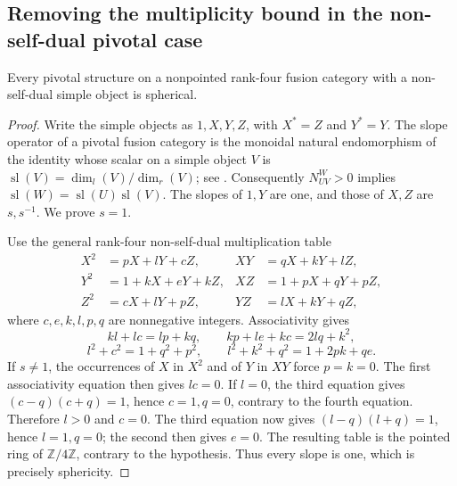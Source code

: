 \subsection{Removing the multiplicity bound in the non-self-dual pivotal case}

\begin{lemma}\label{lem:rank4-nonselfdual-spherical}
Every pivotal structure on a nonpointed rank-four fusion category with a
non-self-dual simple object is spherical.
\end{lemma}
\begin{proof}
Write the simple objects as $1,X,Y,Z$, with $X^*=Z$ and $Y^*=Y$.
The slope operator of a pivotal fusion category is the monoidal natural
endomorphism of the identity whose scalar on a simple object $V$ is
$\operatorname{sl}(V)=\dim_l(V)/\dim_r(V)$; see
\cite[Section~4C]{BVCenter}.
Consequently $N_{UV}^W>0$ implies
$\operatorname{sl}(W)=\operatorname{sl}(U)\operatorname{sl}(V)$.
The slopes of $1,Y$ are one, and those of $X,Z$ are $s,s^{-1}$.
We prove $s=1$.

Use the general rank-four non-self-dual multiplication table
\[
\begin{aligned}
 X^2&=pX+lY+cZ,& X Y&=qX+kY+lZ,\\
 Y^2&=1+kX+eY+kZ,& XZ&=1+pX+qY+pZ,\\
 Z^2&=cX+lY+pZ,& YZ&=lX+kY+qZ,
\end{aligned}
\]
where $c,e,k,l,p,q$ are nonnegative integers. Associativity gives
\[
 kl+lc=lp+kq,\qquad kp+le+kc=2lq+k^2,
\]
\[
 l^2+c^2=1+q^2+p^2,\qquad l^2+k^2+q^2=1+2pk+qe.
\]
If $s\ne1$, the occurrences of $X$ in $X^2$ and of $Y$ in $XY$ force
$p=k=0$. The first associativity equation then gives $lc=0$. If $l=0$,
the third equation gives $(c-q)(c+q)=1$, hence $c=1,q=0$, contrary to
the fourth equation. Therefore $l>0$ and $c=0$. The third equation now
gives $(l-q)(l+q)=1$, hence $l=1,q=0$; the second then gives $e=0$.
The resulting table is the pointed ring of $\mathbb Z/4\mathbb Z$,
contrary to the hypothesis. Thus every slope is one, which is precisely
sphericity.
\end{proof}


